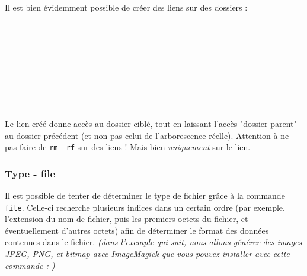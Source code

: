 Il est bien évidemment possible de créer des liens sur des dossiers :\\

\\
\\
\\
\\
\\
\\
\\
\\
\\

Le lien créé donne accès au dossier ciblé, tout en laissant l'accès "dossier parent" au dossier précédent (et non pas celui de l'arborescence réelle).
Attention à ne pas faire de \texttt{rm -rf} sur des liens !
Mais bien \textit{uniquement} sur le lien.\\

\bigskip

\subsubsection{Type - file}

\bigskip

Il est possible de tenter de déterminer le type de fichier grâce à la commande \texttt{file}.
Celle-ci recherche plusieurs indices dans un certain ordre (par exemple, l'extension du nom de fichier, puis les premiers octets du fichier, et éventuellement d'autres octets) afin de déterminer le format des données contenues dans le fichier.
\textit{(dans l'exemple qui suit, nous allons générer des images JPEG, PNG, et bitmap avec ImageMagick que vous pouvez installer avec cette commande : )}\\

\\
\\
\\
\\
\\
\\
\\

